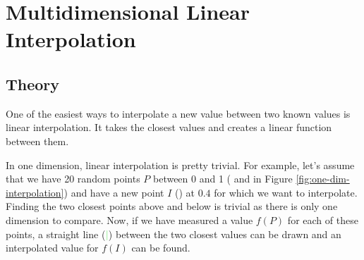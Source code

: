 \section{Multidimensional Linear Interpolation}

\subsection{Theory}

One of the easiest ways to interpolate a new value between two known values is linear interpolation. It takes the closest values and creates a linear function between them.

In one dimension, linear interpolation is pretty trivial. For example, let's assume that we have 20 random points $P$ between 0 and 1 (\textcolor{Red}{\textbullet} and  \textcolor{Blue}{\textbullet} in Figure \ref{fig:one-dim-interpolation}) and have a new point $I$ (\textcolor{Green}{\textbullet}) at $0.4$ for which we want to interpolate. Finding the two closest points \textcolor{Red}{\textbullet} above and below is trivial as there is only one dimension to compare. Now, if we have measured a value $f(P)$ for each of these points, a straight line (\textcolor{LightGreen}{\textbf{|}}) between the two closest values can be drawn and an interpolated value for $f(I)$ can be found. 




